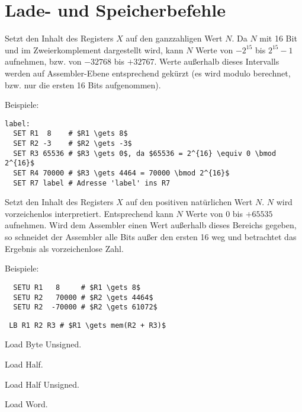 \section{Lade- und Speicherbefehle}

Setzt den Inhalt des Registers $X$ auf den ganzzahligen Wert $N$.
Da $N$ mit 16 Bit und im Zweierkomplement dargestellt wird, kann $N$ Werte von
$-2^{15}$ bis $2^{15} - 1$ aufnehmen, bzw. von $-32768$ bis $+32767$.
Werte außerhalb dieses Intervalls werden auf Assembler-Ebene entsprechend
gekürzt (es wird modulo berechnet, bzw. nur die ersten 16 Bits aufgenommen).

Beispiele:
\begin{lstlisting}
label:
  SET R1  8    # $R1 \gets 8$
  SET R2 -3    # $R2 \gets -3$
  SET R3 65536 # $R3 \gets 0$, da $65536 = 2^{16} \equiv 0 \bmod 2^{16}$
  SET R4 70000 # $R3 \gets 4464 = 70000 \bmod 2^{16}$
  SET R7 label # Adresse 'label' ins R7
\end{lstlisting}


Setzt den Inhalt des Registers $X$ auf den positiven natürlichen Wert $N$.
$N$ wird vorzeichenlos interpretiert. Entsprechend kann $N$ Werte von $0$ bis
$+65535$ aufnehmen.
Wird dem Assembler einen Wert außerhalb dieses Bereichs gegeben, so
schneidet der Assembler alle Bits außer den ersten 16 weg und betrachtet das
Ergebnis als vorzeichenlose Zahl.

Beispiele:
\begin{lstlisting}
  SETU R1   8     # $R1 \gets 8$
  SETU R2   70000 # $R2 \gets 4464$
  SETU R2  -70000 # $R2 \gets 61072$
\end{lstlisting}






\begin{lstlisting}
 LB R1 R2 R3 # $R1 \gets mem(R2 + R3)$
\end{lstlisting}


\glqq Load Byte Unsigned\grqq.


\glqq Load Half\grqq.


\glqq Load Half Unsigned\grqq.


\glqq Load Word\grqq.


